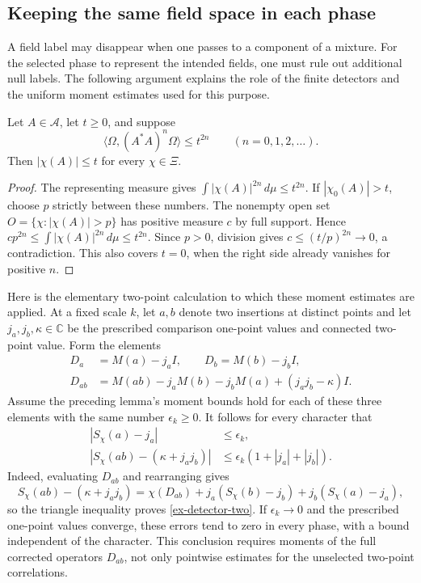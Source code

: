 \subsection{Keeping the same field space in each phase}
\label{ex-phase-fields}

A field label may disappear when one passes to a component of a mixture.
For the selected phase to represent the intended fields, one must rule out
additional null labels. The following argument explains the role of the
finite detectors and the uniform moment estimates used for this purpose.

\begin{lemma}\label{ex-character-moments}
Let \(A\in\mathcal A\), let \(t\ge0\), and suppose
\[
 \langle\Omega,(A^*A)^n\Omega\rangle\le t^{2n}
 \qquad(n=0,1,2,\ldots).
\]
Then \(|\chi(A)|\le t\) for every \(\chi\in\Xi\).
\end{lemma}
\begin{proof}
The representing measure gives
\(\int|\chi(A)|^{2n}\,d\mu\le t^{2n}\).
If \(|\chi_0(A)|>t\), choose \(p\) strictly between these numbers.
The nonempty open set \(O=\{\chi:|\chi(A)|>p\}\) has positive measure
\(c\) by full support. Hence
\(cp^{2n}\le\int|\chi(A)|^{2n}\,d\mu\le t^{2n}\).
Since \(p>0\), division gives \(c\le(t/p)^{2n}\to0\), a
contradiction. This also covers \(t=0\), when the right side already
vanishes for positive \(n\).
\end{proof}

Here is the elementary two-point calculation to which these moment
estimates are applied. At a fixed scale \(k\), let \(a,b\) denote two
insertions at distinct points and let \(j_a,j_b,\kappa\in\mathbb C\)
be the prescribed comparison one-point values and connected two-point
value. Form the elements
\begin{align*}
 D_a&=M(a)-j_aI,\qquad D_b=M(b)-j_bI,\\
 D_{ab}&=M(ab)-j_aM(b)-j_bM(a)+(j_aj_b-\kappa)I.
\end{align*}
Assume the preceding lemma's moment bounds hold for each of these three
elements with the same number \(\epsilon_k\ge0\). It follows for every
character that
\begin{align}
 |S_\chi(a)-j_a|&\le\epsilon_k,\label{ex-detector-one}\\
 |S_\chi(ab)-(\kappa+j_aj_b)|
 &\le\epsilon_k(1+|j_a|+|j_b|).\label{ex-detector-two}
\end{align}
Indeed, evaluating \(D_{ab}\) and rearranging gives
\[
 S_\chi(ab)-(\kappa+j_aj_b)
 =\chi(D_{ab})+j_a(S_\chi(b)-j_b)+j_b(S_\chi(a)-j_a),
\]
so the triangle inequality proves \eqref{ex-detector-two}.
If \(\epsilon_k\to0\) and the prescribed one-point values converge,
these errors tend to zero in every phase, with a bound independent of
the character. This conclusion requires moments of the full corrected
operators \(D_{ab}\), not only pointwise estimates for the unselected
two-point correlations.


